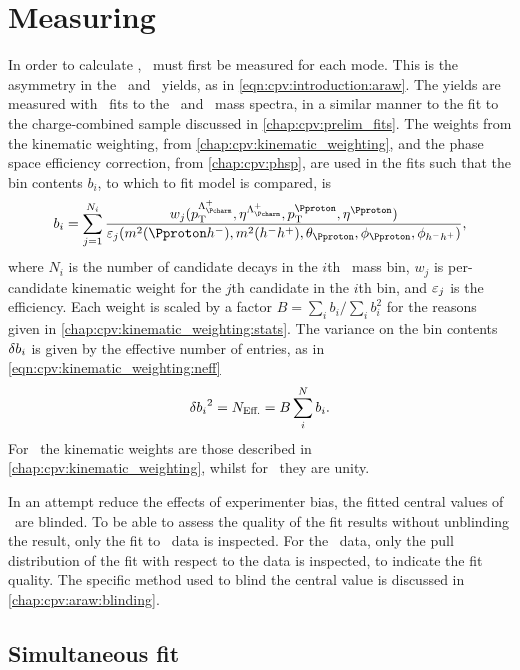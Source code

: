 \chapter{Measuring \texorpdfstring{\ARaw}{ARaw}}
\label{chap:cpv:araw}

In order to calculate \dACP, \ARaw\ must first be measured for each mode.
This is the asymmetry in the \PLambdac\ and \APLambdac\ yields, as in
\cref{eqn:cpv:introduction:araw}.
The yields are measured with \chisq\ fits to the \PLambdac\ and \APLambdac\
mass spectra, in a similar manner to the fit to the charge-combined sample
discussed in \cref{chap:cpv:prelim_fits}.
The weights from the kinematic weighting, from
\cref{chap:cpv:kinematic_weighting}, and the phase space efficiency correction,
from \cref{chap:cpv:phsp}, are used in the fits such that the bin contents
$b_{i}$, to which to fit model is compared, is
\begin{equation}
  b_{i} = \sum_{j = 1}^{N_{i}} \frac{%
    w_{j}(\pT^{\PLambdac}, \Eta^{\PLambdac},
          \pT^{\Pproton}, \Eta^{\Pproton})
  }{%
    \eff_{j}(\msqphm, \msqhh, \thetap, \phip, \phihh)
  },
  \label{eqn:cpv:araw:total_weights}
\end{equation}
where $N_{i}$ is the number of candidate decays in the $i$th \phh\ mass bin,
$w_{j}$ is per-candidate kinematic weight for the $j$th candidate in the $i$th
bin, and $\varepsilon_{j}$ is the efficiency.
Each weight is scaled by a factor $B = \sum_{i} b_{i}/\sum_{i} b_{i}^{2}$ for
the reasons given in \cref{chap:cpv:kinematic_weighting:stats}.
The variance on the bin contents $\delta{b_{i}}$ is given by the effective number
of entries, as in \cref{eqn:cpv:kinematic_weighting:neff}
\begin{equation}
  \delta{b_{i}}^{2} = N_{\text{Eff.}} = B\sum_{i}^{N} b_{i}.
\end{equation}
For \ppipi\ the kinematic weights are those described in
\cref{chap:cpv:kinematic_weighting}, whilst for \pKK\ they are unity.

In an attempt reduce the effects of experimenter bias, the fitted central
values of \ARaw\ are blinded.
To be able to assess the quality of the fit results without unblinding the
result, only the fit to \PLambdac\ data is inspected.
For the \APLambdac\ data, only the pull distribution of the fit with respect to
the data is inspected, to indicate the fit quality.
The specific method used to blind the central value is discussed in
\cref{chap:cpv:araw:blinding}.

\section{Simultaneous fit}
\label{chap:cpv:araw:simultaneous_fit}

